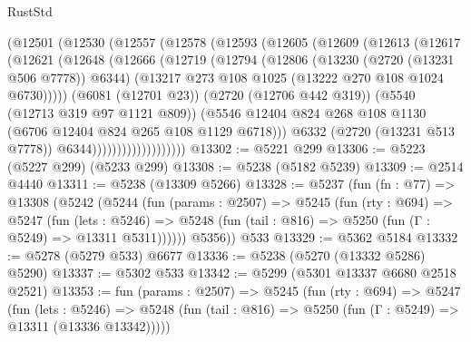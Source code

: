 \begin{lexlean}{RustStd}
\begin{coremodule}
                    (@12501
                      (@12530
                        (@12557
                          (@12578
                            (@12593
                              (@12605
                                (@12609
                                  (@12613
                                    (@12617
                                      (@12621
                                        (@12648
                                          (@12666
                                            (@12719
                                              (@12794
                                                (@12806
                                                  (@13230 (@2720 (@13231 @506 @7778)) @6344)
                                                  (@13217
                                                    @273
                                                    @108
                                                    @1025
                                                    (@13222 @270 @108 @1024 @6730)))))
                                            (@6081 (@12701 @23))
                                            (@2720 (@12706 @442 @319))
                                            (@5540 (@12713 @319 @97 @1121 @809))
                                            (@5546
                                              @12404
                                              @824
                                              @268
                                              @108
                                              @1130
                                              (@6706 @12404 @824 @265 @108 @1129 @6718)))
                                          @6332
                                          (@2720 (@13231 @513 @7778))
                                          @6344)))))))))))))))))))
@13302 := @5221 @299
@13306 := @5223 (@5227 @299) (@5233 @299)
@13308 := @5238 (@5182 @5239)
@13309 := @2514 @4440
@13311 := @5238 (@13309 @5266)
@13328 := @5237
    (fun (fn : @77) =>
    @13308
      (@5242
        (@5244
          (fun (params : @2507) =>
          @5245
            (fun (rty : @694) =>
            @5247
              (fun (lets : @5246) =>
              @5248 (fun (tail : @816) => @5250 (fun (Γ : @5249) => @13311 @5311))))))
        @5356))
    @533
@13329 := @5362 @5184
@13332 := @5278 (@5279 @533) @6677
@13336 := @5238 (@5270 (@13332 @5286) @5290)
@13337 := @5302 @533
@13342 := @5299 (@5301 @13337 @6680 @2518 @2521)
@13353 := fun (params : @2507) =>
  @5245
    (fun (rty : @694) =>
    @5247
      (fun (lets : @5246) =>
      @5248 (fun (tail : @816) => @5250 (fun (Γ : @5249) => @13311 (@13336 @13342)))))

\end{coremodule}
\end{lexlean}
